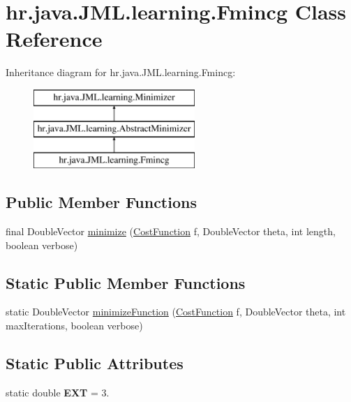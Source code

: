 \hypertarget{classhr_1_1java_1_1_j_m_l_1_1learning_1_1_fmincg}{\section{hr.\+java.\+J\+M\+L.\+learning.\+Fmincg Class Reference}
\label{classhr_1_1java_1_1_j_m_l_1_1learning_1_1_fmincg}
}
Inheritance diagram for hr.\+java.\+J\+M\+L.\+learning.\+Fmincg\+:\begin{figure}[H]
\begin{center}
\leavevmode
\includegraphics[height=3.000000cm]{classhr_1_1java_1_1_j_m_l_1_1learning_1_1_fmincg}
\end{center}
\end{figure}
\subsection*{Public Member Functions}
\begin{DoxyCompactItemize}
\item 
final Double\+Vector \hyperlink{classhr_1_1java_1_1_j_m_l_1_1learning_1_1_fmincg_a91e1dfdbc2222e1844a3c6d079a7e3e7}{minimize} (\hyperlink{interfacehr_1_1java_1_1_j_m_l_1_1cost_1_1_cost_function}{Cost\+Function} f, Double\+Vector theta, int length, boolean verbose)
\end{DoxyCompactItemize}
\subsection*{Static Public Member Functions}
\begin{DoxyCompactItemize}
\item 
static Double\+Vector \hyperlink{classhr_1_1java_1_1_j_m_l_1_1learning_1_1_fmincg_a214ab4364ba5cba6fdf1bcebd6d74be5}{minimize\+Function} (\hyperlink{interfacehr_1_1java_1_1_j_m_l_1_1cost_1_1_cost_function}{Cost\+Function} f, Double\+Vector theta, int max\+Iterations, boolean verbose)
\end{DoxyCompactItemize}
\subsection*{Static Public Attributes}
\begin{DoxyCompactItemize}
\item 
\hypertarget{classhr_1_1java_1_1_j_m_l_1_1learning_1_1_fmincg_a2a668ac99dd7384c2328358bdecfc7fe}{static double {\bfseries E\+X\+T} = 3.}\label{classhr_1_1java_1_1_j_m_l_1_1learning_1_1_fmincg_a2a668ac99dd7384c2328358bdecfc7fe}

\end{DoxyCompactItemize}
